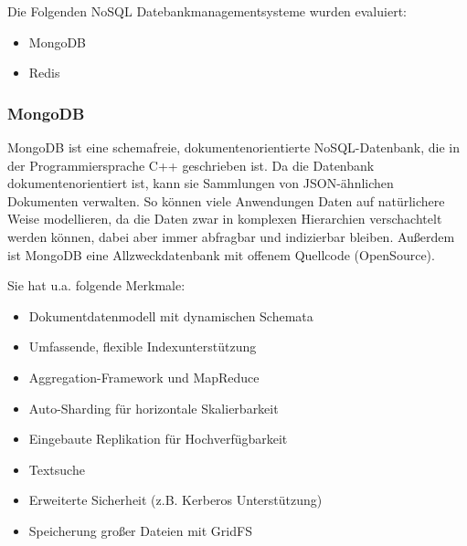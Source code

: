 Die Folgenden \gls{NoSQL} Datebankmanagementsysteme wurden evaluiert:

\begin{itemize}
	\item MongoDB
	\item Redis
\end{itemize}

\subsubsection{MongoDB}
\label{sec:mongoDB}
MongoDB ist eine schemafreie, dokumentenorientierte NoSQL-Datenbank, die in der Programmiersprache C++ geschrieben ist. Da die Datenbank dokumentenorientiert ist, kann sie Sammlungen von \gls{JSON}-\"ahnlichen Dokumenten verwalten. So k\"onnen viele Anwendungen Daten auf nat\"urlichere Weise modellieren, da die Daten zwar in komplexen Hierarchien verschachtelt werden k\"onnen, dabei aber immer abfragbar und indizierbar bleiben. Au{\ss}erdem ist MongoDB eine Allzweckdatenbank mit offenem Quellcode (OpenSource). \cite{MongoDB_wiki}

\newpage
Sie hat u.a. folgende Merkmale: \cite{MongoDB_characteristics}

\begin{itemize}
	\item Dokumentdatenmodell mit dynamischen Schemata
	\item Umfassende, flexible Indexunterst\"utzung
	\item Aggregation-Framework und MapReduce
	\item Auto-Sharding f\"ur horizontale Skalierbarkeit
	\item Eingebaute Replikation f\"ur Hochverf\"ugbarkeit
	\item Textsuche
	\item Erweiterte Sicherheit (z.B. Kerberos Unterst\"utzung)
	\item Speicherung gro{\ss}er Dateien mit GridFS
\end{itemize}

